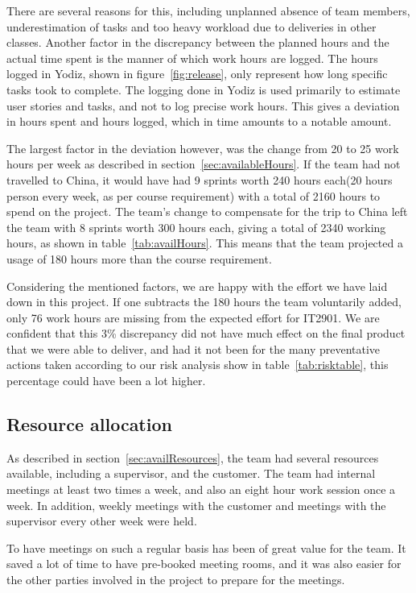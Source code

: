 There are several reasons for this, including unplanned absence of team members, underestimation of tasks and too heavy workload due to deliveries in other classes. Another factor in the discrepancy between the planned hours and the actual time spent is the manner of which work hours are logged. The hours logged in Yodiz, shown in figure~\ref{fig:release}, only represent how long specific tasks took to complete. The logging done in Yodiz is used primarily to estimate user stories and tasks, and not to log precise work hours. This gives a deviation in hours spent and hours logged, which in time amounts to a notable amount. 

The largest factor in the deviation however, was the change from 20 to 25 work hours per week as described in section~\ref{sec:availableHours}. If the team had not travelled to China, it would have had 9 sprints worth 240 hours each(20 hours person every week, as per course requirement) with a total of 2160 hours to spend on the project. The team's change to compensate for the trip to China left the team with 8 sprints worth 300 hours each, giving a total of 2340 working hours, as shown in table~\ref{tab:availHours}. This means that the team projected a usage of 180 hours more than the course requirement.

Considering the mentioned factors, we are happy with the effort we have laid down in this project. If one subtracts the 180 hours the team voluntarily added, only 76 work hours are missing from the expected effort for IT2901. We are confident that this 3\% discrepancy did not have much effect on the final product that we were able to deliver, and had it not been for the many preventative actions taken according to our risk analysis show in table~\ref{tab:risktable}, this percentage could have been a lot higher.

\subsection{Resource allocation}
As described in section~\ref{sec:availResources}, the team had several resources available, including a supervisor, and the customer. The team had internal meetings at least two times a week, and also an eight hour work session once a week. In addition, weekly meetings with the customer and meetings with the supervisor every other week were held.

To have meetings on such a regular basis has been of great value for the team. It saved a lot of time to have pre-booked meeting rooms, and it was also easier for the other parties involved in the project to prepare for the meetings.

